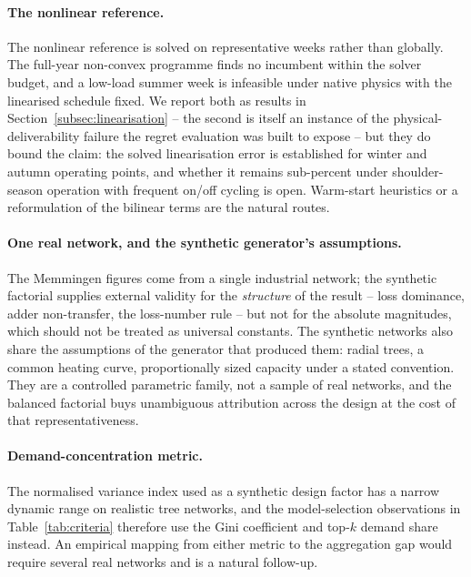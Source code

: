 \paragraph{The nonlinear reference.}
The nonlinear reference is solved on representative weeks rather than globally. The
full-year non-convex programme finds no incumbent within the solver budget, and a low-load
summer week is infeasible under native physics with the linearised schedule fixed. We
report both as results in Section~\ref{subsec:linearisation} -- the second is itself an
instance of the physical-deliverability failure the regret evaluation was built to expose
-- but they do bound the claim: the solved linearisation error is established for winter
and autumn operating points, and whether it remains sub-percent under shoulder-season
operation with frequent on/off cycling is open. Warm-start heuristics or a reformulation
of the bilinear terms are the natural routes.

\paragraph{One real network, and the synthetic generator's assumptions.}
The Memmingen figures come from a single industrial network; the synthetic factorial
supplies external validity for the \emph{structure} of the result -- loss dominance,
adder non-transfer, the loss-number rule -- but not for the absolute magnitudes, which
should not be treated as universal constants. The synthetic networks also share the
assumptions of the generator that produced them: radial trees, a common heating curve,
proportionally sized capacity under a stated convention. They are a controlled parametric
family, not a sample of real networks, and the balanced factorial buys unambiguous
attribution across the design at the cost of that representativeness.

\paragraph{Demand-concentration metric.}
The normalised variance index used as a synthetic design factor has a narrow dynamic range
on realistic tree networks, and the model-selection observations in
Table~\ref{tab:criteria} therefore use the Gini coefficient and top-$k$ demand share
instead. An empirical mapping from either metric to the aggregation gap would require
several real networks and is a natural follow-up.
